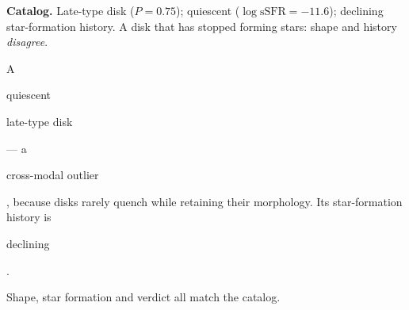 \newcommand{\gOK}{{\color{teal!80!black}\,$\checkmark$}}
\newcommand{\gNO}{{\color{coral}\,$\times$}}
\newcommand{\hGood}[1]{{\setlength{\fboxsep}{0.6pt}\colorbox{paleteal}{\strut #1}}}
\newcommand{\hBad}[1]{{\setlength{\fboxsep}{0.6pt}\colorbox{palecoral}{\strut #1}}}
\begin{minipage}[t]{0.47\textwidth}\vspace{0pt}
  \begin{tcolorbox}[exbox, colframe=neutral, colbacktitle=palegrey,
      title={Galaxy: does its shape agree with its history?}]
    \raggedright
    \textbf{Catalog.} Late-type disk ($P{=}0.75$); quiescent
    ($\log \mathrm{sSFR} = -11.6$); declining star-formation history.
    A disk that has stopped forming stars: shape and history
    \emph{disagree}.
  \end{tcolorbox}\vspace{-2pt}
  \begin{tcolorbox}[exbox, colframe=teal!80!black, colbacktitle=paleteal,
      title={Narrator (no tool token)\gOK}]
    \raggedright
    A \hGood{quiescent} \hGood{late-type disk} --- a
    \hGood{cross-modal outlier}, because disks rarely quench while retaining
    their morphology. Its star-formation history is \hGood{declining}.
  \end{tcolorbox}
  {\scriptsize\color{neutral} Shape, star formation and verdict all match the
  catalog.}
\end{minipage}\hfill
